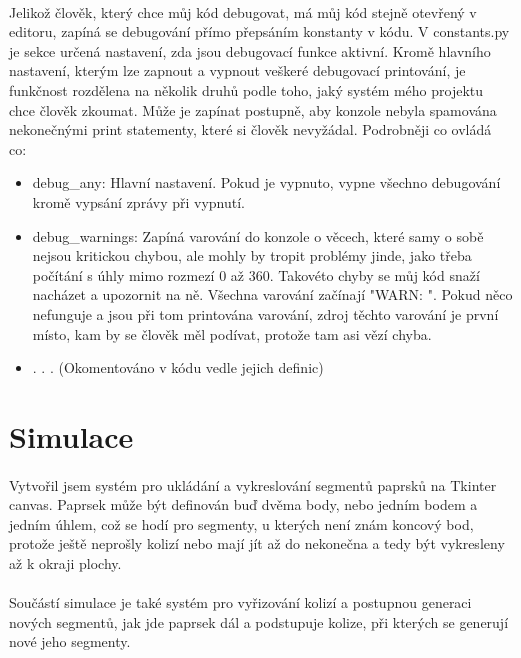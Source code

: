 \documentclass[12pt,a4paper]{report}
\begin{document}
\paragraph{} Jelikož člověk, který chce můj kód debugovat, má můj kód stejně otevřený v editoru, zapíná se debugování přímo přepsáním konstanty v kódu. V constants.py je sekce určená nastavení, zda jsou debugovací funkce aktivní. Kromě hlavního nastavení, kterým lze zapnout a vypnout veškeré debugovací printování, je funkčnost rozdělena na několik druhů podle toho, jaký systém mého projektu chce člověk zkoumat. Může je zapínat postupně, aby konzole nebyla spamována nekonečnými print statementy, které si člověk nevyžádal. Podrobněji co ovládá co:
\begin{itemize}
    \item debug\_any: Hlavní nastavení. Pokud je vypnuto, vypne všechno debugování kromě vypsání zprávy při vypnutí.
    \item debug\_warnings: Zapíná varování do konzole o věcech, které samy o sobě nejsou kritickou chybou, ale mohly by tropit problémy jinde, jako třeba počítání s úhly mimo rozmezí 0 až 360. Takovéto chyby se můj kód snaží nacházet a upozornit na ně. Všechna varování začínají "WARN: ". Pokud něco nefunguje a jsou při tom printována varování, zdroj těchto varování je první místo, kam by se člověk měl podívat, protože tam asi vězí chyba.
    \item . . . (Okomentováno v kódu vedle jejich definic)
\end{itemize}

\section{Simulace}
\paragraph{} Vytvořil jsem systém pro ukládání a vykreslování segmentů paprsků na Tkinter canvas. Paprsek může být definován buď dvěma body, nebo jedním bodem a jedním úhlem, což se hodí pro segmenty, u kterých není znám koncový bod, protože ještě neprošly kolizí nebo mají jít až do nekonečna a tedy být vykresleny až k okraji plochy.
\paragraph{} Součástí simulace je také systém pro vyřizování kolizí a postupnou generaci nových segmentů, jak jde paprsek dál a podstupuje kolize, při kterých se generují nové jeho segmenty.
\end{document}
